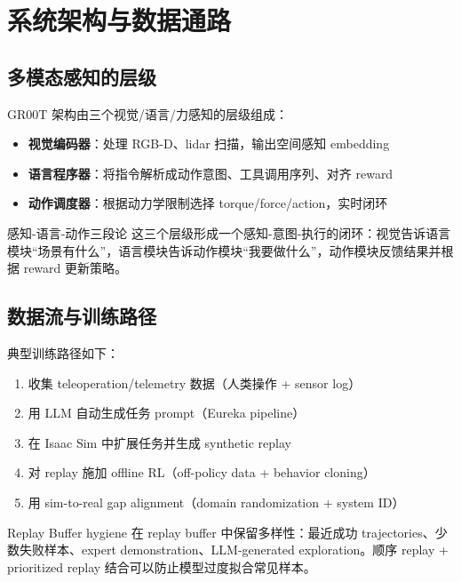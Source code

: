 \section{系统架构与数据通路}

\subsection{多模态感知的层级}

GR00T 架构由三个视觉/语言/力感知的层级组成：

\begin{itemize}
    \item \textbf{视觉编码器}：处理 RGB-D、lidar 扫描，输出空间感知 embedding
    \item \textbf{语言程序器}：将指令解析成动作意图、工具调用序列、对齐 reward
    \item \textbf{动作调度器}：根据动力学限制选择 torque/force/action，实时闭环
\end{itemize}

\begin{knowledgebox}{感知-语言-动作三段论}
这三个层级形成一个感知-意图-执行的闭环：视觉告诉语言模块“场景有什么”，语言模块告诉动作模块“我要做什么”，动作模块反馈结果并根据 reward 更新策略。
\end{knowledgebox}

\subsection{数据流与训练路径}

典型训练路径如下：

\begin{enumerate}
    \item 收集 teleoperation/telemetry 数据（人类操作 + sensor log）
    \item 用 LLM 自动生成任务 prompt（Eureka pipeline）
    \item 在 Isaac Sim 中扩展任务并生成 synthetic replay
    \item 对 replay 施加 offline RL（off-policy data + behavior cloning）
    \item 用 sim-to-real gap alignment（domain randomization + system ID）
\end{enumerate}

\begin{importantbox}{Replay Buffer hygiene}
在 replay buffer 中保留多样性：最近成功 trajectories、少数失败样本、expert demonstration、LLM-generated exploration。顺序 replay + prioritized replay 结合可以防止模型过度拟合常见样本。
\end{importantbox}

